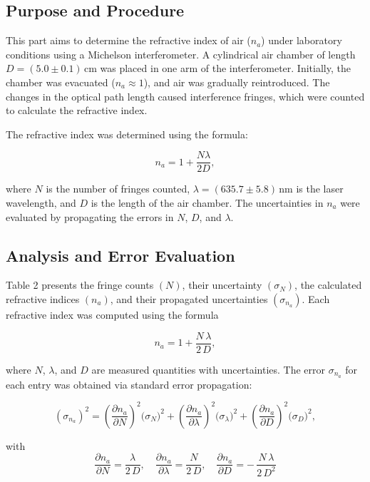 \subsection{Purpose and Procedure}

This part aims to determine the refractive index of air (\(n_a\)) under laboratory conditions using a Michelson interferometer. A cylindrical air chamber of length \(D = (5.0 \pm 0.1) \, \text{cm}\) was placed in one arm of the interferometer. Initially, the chamber was evacuated (\(n_a \approx 1\)), and air was gradually reintroduced. The changes in the optical path length caused interference fringes, which were counted to calculate the refractive index.  

The refractive index was determined using the formula:  

\[
n_a = 1 + \frac{N \lambda}{2D},
\]  

where \(N\) is the number of fringes counted, \(\lambda = (635.7 \pm 5.8) \, \text{nm}\) is the laser wavelength, and \(D\) is the length of the air chamber. The uncertainties in \(n_a\) were evaluated by propagating the errors in \(N\), \(D\), and \(\lambda\).  

\subsection{Analysis and Error Evaluation}


Table 2 presents the fringe counts \((N)\), their uncertainty \((\sigma_{N})\), the calculated refractive indices \((n_a)\), and their propagated uncertainties \((\sigma_{n_a})\). Each refractive index was computed using the formula

\[
n_a = 1 + \frac{N\,\lambda}{2\,D},
\]

where \(N\), \(\lambda\), and \(D\) are measured quantities with uncertainties. The error \(\sigma_{n_a}\) for each entry was obtained via standard error propagation:

\[
(\sigma_{n_a})^2
= \left(\frac{\partial n_a}{\partial N}\right)^2 \bigl(\sigma_N\bigr)^2
+ \left(\frac{\partial n_a}{\partial \lambda}\right)^2 \bigl(\sigma_\lambda\bigr)^2
+ \left(\frac{\partial n_a}{\partial D}\right)^2 \bigl(\sigma_D\bigr)^2,
\]

with
\[
\frac{\partial n_a}{\partial N} = \frac{\lambda}{2\,D} , \quad
\frac{\partial n_a}{\partial \lambda} = \frac{N}{2\,D} , \quad
\frac{\partial n_a}{\partial D} = -\,\frac{N\,\lambda}{2\,D^2}
\]

